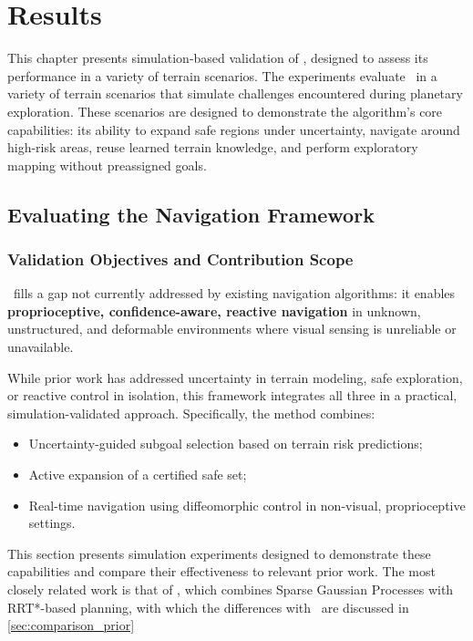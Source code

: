 \chapter{\leavevmode \newline Results}
\label{chap:Results}

This chapter presents simulation-based validation of \algoname, designed to assess its performance in a variety of terrain scenarios. The experiments evaluate \algoname\ in a variety of terrain scenarios that simulate challenges encountered during planetary exploration. These scenarios are designed to demonstrate the algorithm’s core capabilities: its ability to expand safe regions under uncertainty, navigate around high-risk areas, reuse learned terrain knowledge, and perform exploratory mapping without preassigned goals. 

\section{Evaluating the Navigation Framework}

\subsection{Validation Objectives and Contribution Scope}

\algoname\ fills a gap not currently addressed by existing navigation algorithms: it enables \textbf{proprioceptive, confidence-aware, reactive navigation} in unknown, unstructured, and deformable environments where visual sensing is unreliable or unavailable.

While prior work has addressed uncertainty in terrain modeling, safe exploration, or reactive control in isolation, this framework integrates all three in a practical, simulation-validated approach. Specifically, the method combines:
\begin{itemize}
    \item Uncertainty-guided subgoal selection based on terrain risk predictions;
    \item Active expansion of a certified safe set;
    \item Real-time navigation using diffeomorphic control in non-visual, proprioceptive settings.
\end{itemize}

This section presents simulation experiments designed to demonstrate these capabilities and compare their effectiveness to relevant prior work. The most closely related work is that of \textcite{leininger2024gaussianprocessbasedtraversabilityanalysis}, which combines Sparse Gaussian Processes with RRT*-based planning, with which the differences with \algoname\ are discussed in \autoref{sec:comparison_prior}

